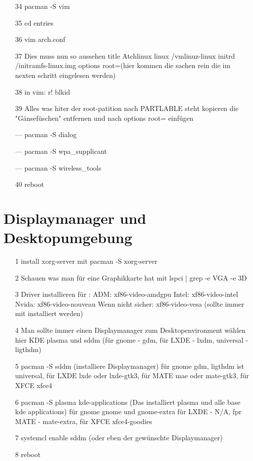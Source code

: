 \documentclass[a4paper,12pt]{article}
\begin{document}
\begin{itemize}
	\item[34] pacman -S vim
	\item[35] cd entries
	\item[36] vim arch.conf
	\item[37] Dies muss nun so aussehen
		\subitem title Atchlinux
		\subitem linux /vmlinuz-linux
		\subitem initrd /initramfs-linux.img
		\subitem options root=(hier kommen die sachen rein die im nexten schritt eingelesen werden)
	\item[38] in vim:    r! blkid
	\item[39] Alles was hiter der root-patition nach PARTLABLE steht kopieren die "Gänsefüschen" entfernen und nach options root=   einfügen
	\item[---] pacman -S dialog
	\item[---] pacman -S wpa\_supplicant
	\item[---] pacman -S wireless\_tools
	\item[40] reboot 
\end{itemize}
	
	\clearpage
	\section{Displaymanager und Desktopumgebung}
	\begin{itemize}
		\item[1] install xorg-server mit pacman -S xorg-server
		\item[2] Schauen was man für eine Graphikkarte hat mit lspci | grep -e VGA -e 3D
		\item[3] Driver installieren für :
			\subitem ADM: xf86-video-amdgpu
			\subitem Intel: xf86-video-intel
			\subitem Nvida: xf86-video-nouveau
			\subitem Wenn nicht sicher: xf86-video-vesa (sollte immer mit installiert werden)
		\item[4] Man sollte immer einen Displaymanager zum Desktopenvironment wählen hier KDE plasma und sddm (für gnome - gdm, für LXDE - lxdm, universal - ligthdm) 
		\item[5] pacman -S sddm (installiere Displaymanager) für gnome gdm, ligthdm ist universal, für LXDE lxde oder lxde-gtk3, für MATE mae oder mate-gtk3, für XFCE xfce4
		\item[6] pacman -S plasma kde-applications (Das installiert plasma und alle base kde applications) für gnome gnome und gnome-extra für LXDE - N/A, fpr MATE - mate-extra, für XFCE xfce4-goodies
		\item[7] systemcl enable sddm (oder eben der gewünschte Displaymanager)
		\item[8] reboot
		
	\end{itemize}
	
	
	
\end{document}
